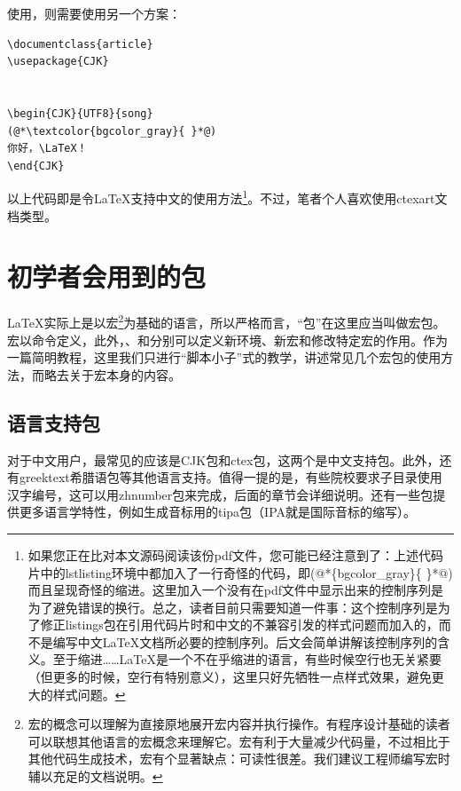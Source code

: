 使用\pdfLaTeX，则需要使用另一个方案：

\begin{lstlisting}[style = LaTeX_TeXworks, caption = 你好，中文\LaTeX - \pdfLaTeX]
\documentclass{article}
\usepackage{CJK}


\begin{CJK}{UTF8}{song}
(@*\textcolor{bgcolor_gray}{ }*@)
你好，\LaTeX！
\end{CJK}

\end{lstlisting}
以上代码即是令\LaTeX 支持中文的使用方法\footnote{如果您正在比对本文源码阅读该份pdf文件，您可能已经注意到了：上述代码片中的lstlisting环境中都加入了一行奇怪的代码，即(@*\{bgcolor\_gray\}\{ \}*@)而且呈现奇怪的缩进。这里加入一个没有在pdf文件中显示出来的控制序列是为了避免错误的换行。总之，读者目前只需要知道一件事：这个控制序列是为了修正listings包在引用代码片时和中文的不兼容引发的样式问题而加入的，而不是编写中文\LaTeX 文档所必要的控制序列。后文会简单讲解该控制序列的含义。至于缩进……\LaTeX 是一个不在乎缩进的语言，有些时候空行也无关紧要（但更多的时候，空行有特别意义），这里只好先牺牲一点样式效果，避免更大的样式问题。}。不过，笔者个人喜欢使用ctexart文档类型。

\section{初学者会用到的包}

\LaTeX 实际上是以宏\footnote{宏的概念可以理解为直接原地展开宏内容并执行操作。有程序设计基础的读者可以联想其他语言的宏概念来理解它。宏有利于大量减少代码量，不过相比于其他代码生成技术，宏有个显著缺点：可读性很差。我们建议工程师编写宏时辅以充足的文档说明。}为基础的语言，所以严格而言，“包”在这里应当叫做宏包。宏以命令定义，此外，、和分别可以定义新环境、新宏和修改特定宏的作用。作为一篇简明教程，这里我们只进行“脚本小子”式的教学，讲述常见几个宏包的使用方法，而略去关于宏本身的内容。


\subsection{语言支持包}

对于中文用户，最常见的应该是CJK包和ctex包，这两个是中文支持包。此外，还有greektext希腊语包等其他语言支持。值得一提的是，有些院校要求子目录使用汉字编号，这可以用zhnumber包来完成，后面的章节会详细说明。还有一些包提供更多语言学特性，例如生成音标用的tipa包（IPA就是国际音标的缩写）。

